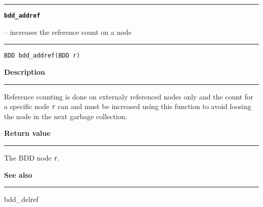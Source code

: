 \begin{minipage}{\textwidth}

\noindent\begin{minipage}{\textwidth}
\rule{\textwidth}{0.5mm}
{\tt\bf bdd\_addref }
\--- increases the reference count on a node  \hspace{\fill}
\\\rule[1.5ex]{\textwidth}{0.5mm}
\end{minipage}

\noindent\begin{verbatim}
BDD bdd_addref(BDD r) 
\end{verbatim}

\vspace{\parsep}\noindent
{\bf Description}\\\rule[1.5ex]{\textwidth}{0.2mm}\vspace{-1.5ex}\setlength{\parindent}{1em}
Reference counting is done on externaly referenced nodes only
           and the count for a specific node {\tt r} can and must be
	   increased using this function to avoid loosing the node in the next
	   garbage collection. 

\setlength{\parindent}{0em}\vspace{\parsep}\vspace{\baselineskip}\noindent
{\bf Return value}\\\rule[1.5ex]{\textwidth}{0.2mm}\vspace{-1.5ex}
The BDD node {\tt r}. 

\vspace{\parsep}\vspace{\baselineskip}\noindent
{\bf See also}\\\rule[1.5ex]{\textwidth}{0.2mm}\vspace{-1.5ex}
bdd\_delref 
\end{minipage}
\vspace{8ex}
